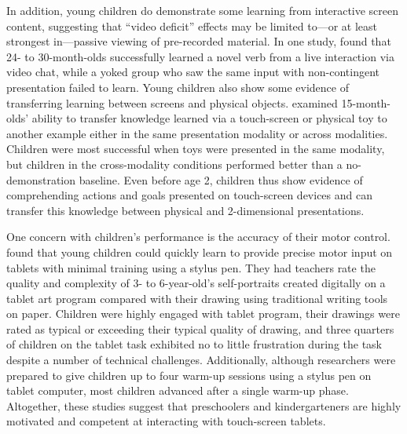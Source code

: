 \documentclass[man,noapacite]{apa2}
\begin{document}
In addition, young children do demonstrate some learning from interactive screen content, suggesting that ``video deficit'' effects may be limited to---or at least strongest in---passive viewing of pre-recorded material. In one study,  found that 24- to 30-month-olds successfully learned a novel verb from a live interaction via video chat, while a yoked group who saw the same input with non-contingent presentation failed to learn.
Young children also show some evidence of transferring learning between screens and physical objects.  examined 15-month-olds' ability to transfer knowledge learned via a touch-screen or physical toy to another example either in the same presentation modality or across modalities. Children were most successful when toys were presented in the same modality, but children in the cross-modality conditions performed better than a no-demonstration baseline. Even before age 2, children thus show evidence of comprehending actions and goals presented on touch-screen devices and can transfer this knowledge between physical and 2-dimensional presentations.

One concern with children's performance is the accuracy of their motor control.  found that young children could quickly learn to provide precise motor input on tablets with minimal training using a stylus pen. They had teachers rate the quality and complexity of 3- to 6-year-old's self-portraits created digitally on a tablet art program compared with their drawing using traditional writing tools on paper. Children were highly engaged with tablet program, their drawings were rated as typical or exceeding their typical quality of drawing, and three quarters of children on the tablet task exhibited no to little frustration during the task despite a number of technical challenges. Additionally, although researchers were prepared to give children up to four warm-up sessions using a stylus pen on tablet computer, most children advanced after a single warm-up phase. Altogether, these studies suggest that preschoolers and kindergarteners are highly motivated and competent at interacting with touch-screen tablets. 
\end{document}
